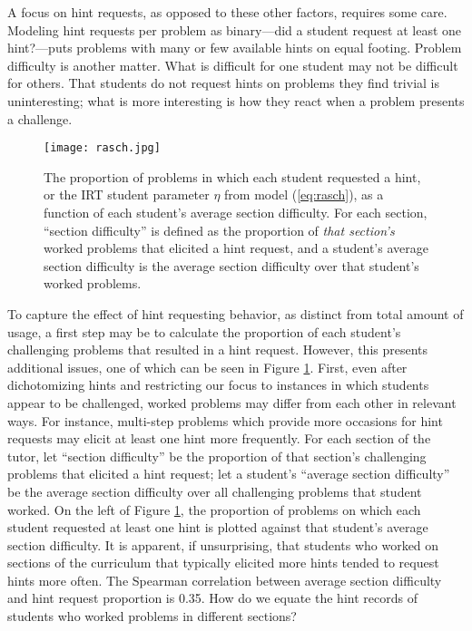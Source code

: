 \documentclass{article}
\begin{document}
A focus on hint requests, as opposed to these other
factors, requires some care.
Modeling hint requests per problem as binary---did a student request
at least one hint?---puts problems with many or few
available hints on equal footing.
Problem difficulty is another matter.
What is difficult for one student may not be difficult for others.
That students do not request hints on problems they find trivial is
uninteresting; what is more interesting is how they react when a
problem presents a challenge.

\begin{figure}
\centering
\texttt{[image: rasch.jpg]}
\caption{The proportion of problems in which each student requested a
  hint, or the IRT student parameter $\eta$ from model
  (\ref{eq:rasch}), as a function of each student's average section difficulty. For each
  section, ``section difficulty'' is defined as the proportion of
  \emph{that section's} worked problems that elicited a hint request,
  and a student's average section difficulty is the average section
  difficulty over that student's worked problems.}
\label{fig:mbar}
\end{figure}

To capture the effect of hint requesting behavior, as distinct from
total amount of usage, a first step may be to calculate the proportion
of each student's challenging problems that resulted in a hint
request.
However, this presents additional issues, one of which can be seen in Figure
\ref{fig:mbar}.
First, even after dichotomizing hints and restricting our focus to
instances in which students appear to be challenged, worked problems
may differ from each other in relevant ways.
For instance, multi-step problems which provide more occasions for hint
requests may elicit at least one hint more frequently.
For each section of the tutor, let ``section difficulty'' be the proportion of that
section's challenging problems that elicited a hint request; let a
student's ``average section difficulty'' be the average section
difficulty over all challenging problems that student worked.
On the left of Figure \ref{fig:mbar}, the proportion of problems on
which each student requested at least one hint is plotted against that
student's average section difficulty.
It is apparent, if unsurprising, that students who worked on sections of the
curriculum that typically elicited more hints tended to request hints
more often.
The Spearman correlation between average section difficulty and hint
request proportion is 0.35.
How do we equate the hint records of students who worked problems in different
sections?
\end{document}

